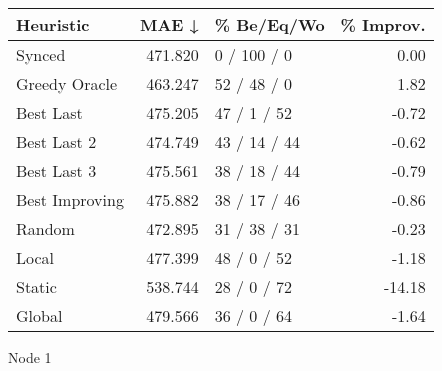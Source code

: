\begin{tabular}{lrlr}
\toprule
\textbf{Heuristic} & \textbf{MAE ↓} & \textbf{\% Be/Eq/Wo} & \textbf{\% Improv.} \\
\midrule
            Synced &        471.820 &          0 / 100 / 0 &                0.00 \\
     Greedy Oracle &        463.247 &          52 / 48 / 0 &                1.82 \\
         Best Last &        475.205 &          47 / 1 / 52 &               -0.72 \\
       Best Last 2 &        474.749 &         43 / 14 / 44 &               -0.62 \\
       Best Last 3 &        475.561 &         38 / 18 / 44 &               -0.79 \\
    Best Improving &        475.882 &         38 / 17 / 46 &               -0.86 \\
            Random &        472.895 &         31 / 38 / 31 &               -0.23 \\
             Local &        477.399 &          48 / 0 / 52 &               -1.18 \\
            Static &        538.744 &          28 / 0 / 72 &              -14.18 \\
            Global &        479.566 &          36 / 0 / 64 &               -1.64 \\
\bottomrule
\end{tabular}
\caption{Node 1}
\label{tab:iid_lr05_le2_bs2_1}
